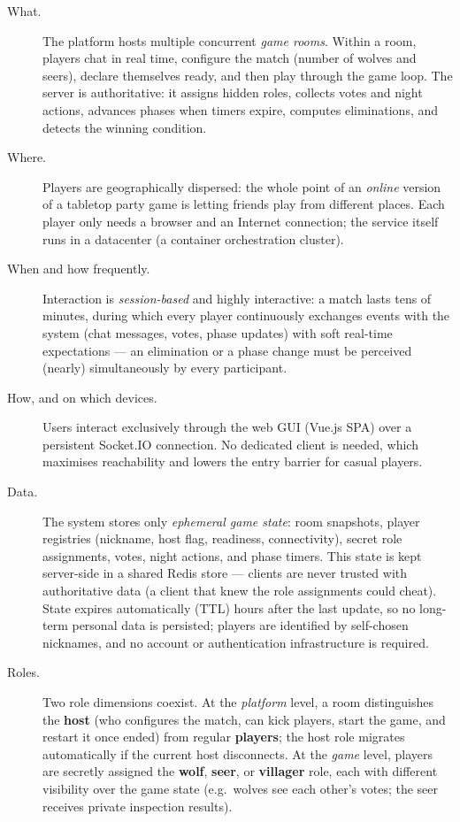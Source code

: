 \documentclass{scrartcl}
\begin{document}
\begin{description}
  \item[What.] The platform hosts multiple concurrent \emph{game rooms}.
  Within a room, players chat in real time, configure the match (number of
  wolves and seers), declare themselves ready, and then play through the
  game loop. The server is authoritative: it assigns hidden roles, collects
  votes and night actions, advances phases when timers expire, computes
  eliminations, and detects the winning condition.

  \item[Where.] Players are geographically dispersed: the whole point of an
  \emph{online} version of a tabletop party game is letting friends play
  from different places. Each player only needs a browser and an Internet
  connection; the service itself runs in a datacenter (a container
  orchestration cluster).

  \item[When and how frequently.] Interaction is \emph{session-based} and
  highly interactive: a match lasts tens of minutes, during which every
  player continuously exchanges events with the system (chat messages,
  votes, phase updates) with soft real-time expectations --- an
  elimination or a phase change must be perceived (nearly)
  simultaneously by every participant.

  \item[How, and on which devices.] Users interact exclusively through the
  web GUI (Vue.js SPA) over a persistent Socket.IO connection. No dedicated
  client is needed, which maximises reachability and lowers the entry
  barrier for casual players.

  \item[Data.] The system stores only \emph{ephemeral game state}: room
  snapshots, player registries (nickname, host flag, readiness,
  connectivity), secret role assignments, votes, night actions, and phase
  timers. This state is kept server-side in a shared Redis store --- clients
  are never trusted with authoritative data (a client that knew the role
  assignments could cheat). State expires automatically (TTL) hours after
  the last update, so no long-term personal data is persisted; players are
  identified by self-chosen nicknames, and no account or authentication
  infrastructure is required.

  \item[Roles.] Two role dimensions coexist. At the \emph{platform} level, a
  room distinguishes the \textbf{host} (who configures the match, can kick
  players, start the game, and restart it once ended) from regular
  \textbf{players}; the host role migrates automatically if the current
  host disconnects. At the \emph{game} level, players are secretly assigned
  the \textbf{wolf}, \textbf{seer}, or \textbf{villager} role, each with
  different visibility over the game state (e.g.\ wolves see each other's
  votes; the seer receives private inspection results).
\end{description}
\end{document}
